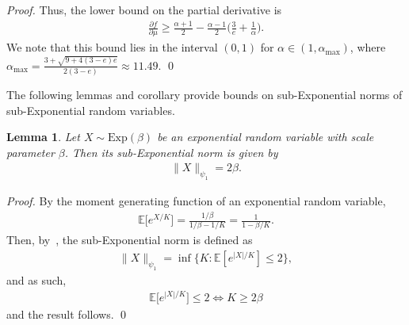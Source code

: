 \documentclass[runningheads]{llncs}
\newtheorem{lem}[theorem]{Lemma}
\begin{document}
\begin{subappendices}
\begin{proof}
    Thus, the lower bound on the partial derivative is
    \begin{align*}
      \frac{\partial f}{\partial \mu}
      \geq
      \frac{\alpha +1}{2} -\frac{\alpha -1}{2} \Big( \frac{3}{e} + \frac{1}{\alpha}\Big).
    \end{align*}
    We note that this bound lies in the interval $(0,1)$ for $\alpha \in
    (1,\alpha_{\max})$, where $\alpha_{\max} = \frac{3+\sqrt{9+4(3-e)e}}{2(3-e)}
    \approx 11.49$.
    \qed
  \end{proof}
  \noindent
  The following lemmas and corollary provide bounds on sub-Exponential norms of
  sub-Exponential random variables.
  \begin{lem}\label{lem:subexp-norm}
    Let $X \sim \text{Exp}(\beta)$ be an exponential random variable with scale
    parameter $\beta$.
    Then its sub-Exponential norm is given by
    \begin{align*}
      \|X\|_{\psi_1} = 2\beta.
    \end{align*}
\end{lem}
\begin{proof}
  By the moment generating function of an exponential random variable,
  \begin{align*}
    \mathbb{E}\Big[ e^{X / K}\Big] = \frac{1/\beta}{1/\beta-1/K} = \frac{1}{1-\beta/K}.
  \end{align*}
  Then, by~\cite[Definition 2.8.4]{vershynin2020high}, the sub-Exponential norm
  is defined as
  \begin{align*}
    \|X\|_{\psi_1} = \inf \{K : \mathbb{E}[e^{|X| / K}] \leq 2 \},
  \end{align*}
  and as such,
  \begin{align*}
    \mathbb{E}\Big[ e^{|X| / K}\Big] \leq 2
    \iff
    K \geq 2\beta
  \end{align*}
  and the result follows.
  \qed
\end{proof}


\end{subappendices}
\end{document}
